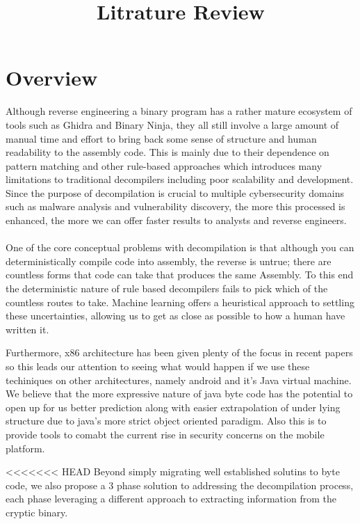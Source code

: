 \documentclass{article}
\author{}
\title{Litrature Review}
\begin{document}
	\maketitle

\section{Overview}
Although reverse engineering a binary program has a rather mature ecosystem of tools such as Ghidra and Binary Ninja, they all still involve a large amount of manual time and effort to bring back some sense of structure and human readability to the assembly code.
This is mainly due to their dependence on pattern matching and other rule-based approaches which introduces many limitations to traditional decompilers including poor scalability and development.
Since the purpose of decompilation is crucial to multiple cybersecurity domains such as malware analysis and vulnerability discovery, the more this processed is enhanced, the more we can offer faster results to analysts and reverse engineers. \\\\

\noindent One of the core conceptual problems with decompilation is that although you can deterministically compile code into assembly, the reverse is untrue; there are countless forms that code can take that produces the same Assembly.
To this end the deterministic nature of rule based decompilers fails to pick which of the countless routes to take.
Machine learning offers a heuristical approach to settling these uncertainties, allowing us to get as close as possible to how a human have written it.

\noindent Furthermore, x86 architecture has been given plenty of the focus in recent papers so this leads our attention to seeing what would happen if we use these techiniques on other architectures, namely android and it's Java virtual machine.
We believe that the more expressive nature of java byte code has the potential to open up for us better prediction along with easier extrapolation of under lying structure due to java's more strict object oriented paradigm.
Also this is to provide tools to comabt the current rise in security concerns on the mobile platform.

<<<<<<< HEAD
Beyond simply migrating well established solutins to byte code, we also propose a 3 phase solution to addressing the decompilation process, each phase leveraging a different approach to extracting information from the cryptic binary.
\end{document}
